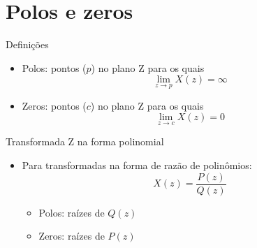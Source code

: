 \section[slide=true]{Polos e zeros}
\begin{slide}{Definições}
   \begin{itemize}
      \item Polos: pontos ($p$) no plano Z para os quais \begin{equation*}\lim_{z\rightarrow p}X(z)= \infty \end{equation*}
      \item Zeros: pontos ($c$) no plano Z para os quais \begin{equation*} \lim_{z\rightarrow c}X(z) = 0 \end{equation*}
   \end{itemize}
\end{slide}

\begin{slide}{Transformada Z na forma polinomial}
   \begin{itemize}
      \item Para transformadas na forma de razão de polinômios:
      \begin{equation*}
           X(z) = \frac{P(z)}{Q(z)}
      \end{equation*}
      \begin{itemize}
         \item Polos: raízes de $Q(z)$
         \item Zeros: raízes de $P(z)$
      \end{itemize}
    \end{itemize}
\end{slide}

